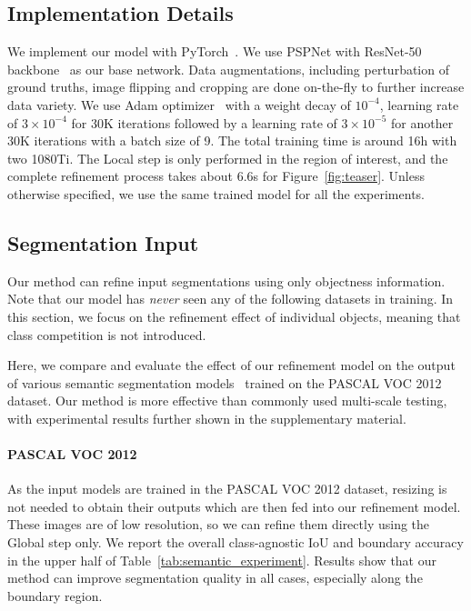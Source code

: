 \documentclass[10pt,twocolumn,letterpaper]{article}
\begin{document}
\subsection{Implementation Details}
We implement our model with PyTorch~\cite{paszke2017automatic}. We use PSPNet with  ResNet-50 backbone~\cite{zhao2017pyramid} as our base network. Data augmentations, including perturbation of ground truths, image flipping and cropping are done on-the-fly to further increase data variety. We use Adam optimizer~\cite{kingma2014adam} with a weight decay of $10^{-4}$, learning rate of $3\times10^{-4}$ for 30K iterations followed by a learning rate of $3\times10^{-5}$ for another 30K iterations with a batch size of 9. The total training time is around 16h with two 1080Ti. The Local step is only performed in the region of interest, and the complete refinement process takes about 6.6s for Figure~\ref{fig:teaser}. 
Unless otherwise specified, we use the same trained model for all the experiments. 

\subsection{Segmentation Input}
Our method can refine input segmentations using only objectness information. Note that our model has \textit{never} seen any of the following datasets in training. In this section, we focus on the refinement effect of individual objects, meaning that class competition is not introduced. 

Here, we compare and evaluate the effect of our refinement model on the output of various semantic segmentation models~\cite{chen2018encoder, zhao2017pyramid} trained on the PASCAL VOC 2012 dataset. Our method is more effective than commonly used multi-scale testing, with experimental results further shown in the supplementary material.

\vspace{-0.1in}
\paragraph{PASCAL VOC 2012}
As the input models are trained in the PASCAL VOC 2012 dataset, 
resizing is not needed to obtain their outputs
which are then fed into our refinement model. These images are of low resolution, so we can refine them directly using the Global step only. 
We report the overall class-agnostic IoU and boundary accuracy in the upper half of Table~\ref{tab:semantic_experiment}. 
Results show that our method can improve segmentation quality in all cases, especially along the boundary region.
\end{document}
